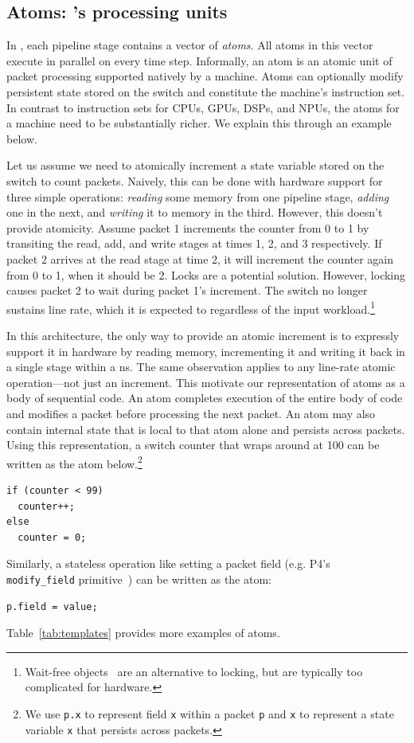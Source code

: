 \subsection{Atoms: \absmachine's processing units}
\label{ss:atoms}

In \absmachine, each pipeline stage contains a vector of \textit{atoms}. All
atoms in this vector execute in parallel on every time step.  Informally, an
atom is an atomic unit of packet processing supported natively by a \absmachine
machine. Atoms can optionally modify persistent state stored on the switch and
constitute the machine's instruction set.  In contrast to instruction sets for
CPUs, GPUs, DSPs, and NPUs, the atoms for a \absmachine machine need to be
substantially richer. We explain this through an example below.

Let us assume we need to atomically increment a state variable stored on the
switch to count packets. Naively, this can be done with hardware support for
three simple operations: \textit{reading} some memory from one pipeline stage,
\textit{adding} one in the next, and \textit{writing} it to memory in the
third. However, this doesn't provide atomicity. Assume packet 1 increments the
counter from 0 to 1 by transiting the read, add, and write stages at times 1,
2, and 3 respectively.  If packet 2 arrives at the read stage at time 2, it
will increment the counter again from 0 to 1, when it should be 2. Locks are a
potential solution. However, locking causes packet 2 to wait during packet 1's
increment. The switch no longer sustains line rate, which it is expected to
regardless of the input workload.\footnote{Wait-free
objects~\cite{herlihy_wait} are an alternative to locking, but are typically
too complicated for hardware.}

In this architecture, the only way to provide an atomic increment is to
expressly support it in hardware by reading memory, incrementing it and writing
it back in a single stage within a ns. The same observation applies to any
line-rate atomic operation---not just an increment.  This motivate our
representation of atoms as a body of sequential code. An atom completes
execution of the entire body of code and modifies a packet before processing
the next packet.  An atom may also contain internal state that is local to that
atom alone and persists across packets.  Using this representation, a switch
counter that wraps around at 100 can be written as the atom below.\footnote{We
  use {\tt p.x} to represent field {\tt x} within a packet {\tt p} and {\tt x}
to represent a state variable {\tt x} that persists across packets.}
\begin{lstlisting}[style=customc, numbers=none, frame=none]
if (counter < 99)
  counter++;
else
  counter = 0;
\end{lstlisting}
Similarly, a stateless operation like setting a packet field (e.g. P4's {\tt
modify\_field} primitive~\cite{p4spec}) can be written as the atom:
\begin{lstlisting}[style=customc, numbers=none, frame=none]
  p.field = value;
\end{lstlisting}
Table~\ref{tab:templates} provides more examples of atoms.

